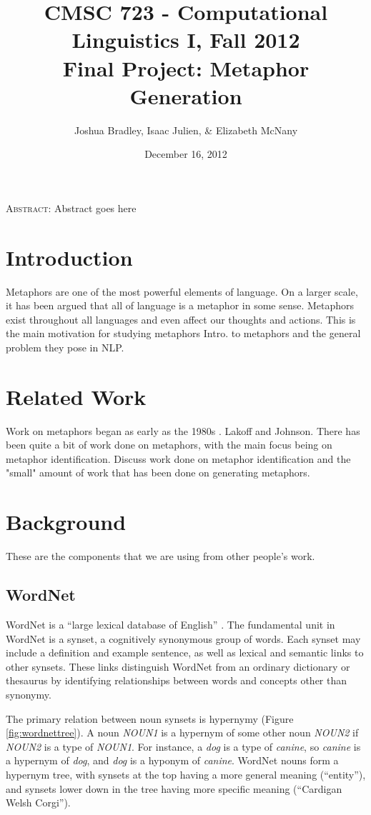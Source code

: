 \documentclass[12pt]{article}
\title{CMSC 723 - Computational Linguistics I, Fall 2012\\
Final Project: Metaphor Generation}
\author{Joshua Bradley, Isaac Julien, \& Elizabeth McNany}
\date{December 16, 2012}
\begin{document}
  \maketitle

\begin{center}
\small
\textsc{Abstract}: Abstract goes here
\end{center}

\section{Introduction}

Metaphors are one of the most powerful elements of language. On a larger scale, it has been argued that all of language is a metaphor in some sense. Metaphors exist throughout all languages and even affect our thoughts and actions. This is the main motivation for studying metaphors Intro. to metaphors and the general problem they pose in NLP.

\section{Related Work}

Work on metaphors began as early as the 1980s \cite{lakoff80}. Lakoff and Johnson. There has been quite a bit of work done on metaphors, with the main focus being on metaphor identification. Discuss work done on metaphor identification and the "small" amount of work that has been done on generating metaphors.

\section{Background}
These are the components that we are using from other people's work.

\subsection{WordNet}

WordNet is a ``large lexical database of English'' \cite{wordnet}. The fundamental unit in WordNet is a synset, a cognitively synonymous group of words. Each synset may include a definition and example sentence, as well as lexical and semantic links to other synsets. These links distinguish WordNet from an ordinary dictionary or thesaurus by identifying relationships between words and concepts other than synonymy.

The primary relation between noun synsets is hypernymy (Figure \ref{fig:wordnettree}). A noun \emph{NOUN1} is a hypernym of some other noun \emph{NOUN2} if \emph{NOUN2} is a type of \emph{NOUN1}. For instance, a \emph{dog} is a type of \emph{canine}, so \emph{canine} is a hypernym of \emph{dog}, and \emph{dog} is a hyponym of \emph{canine}. WordNet nouns form a hypernym tree, with synsets at the top having a more general meaning (``entity''), and synsets lower down in the tree having more specific meaning (``Cardigan Welsh Corgi'').
\end{document}

